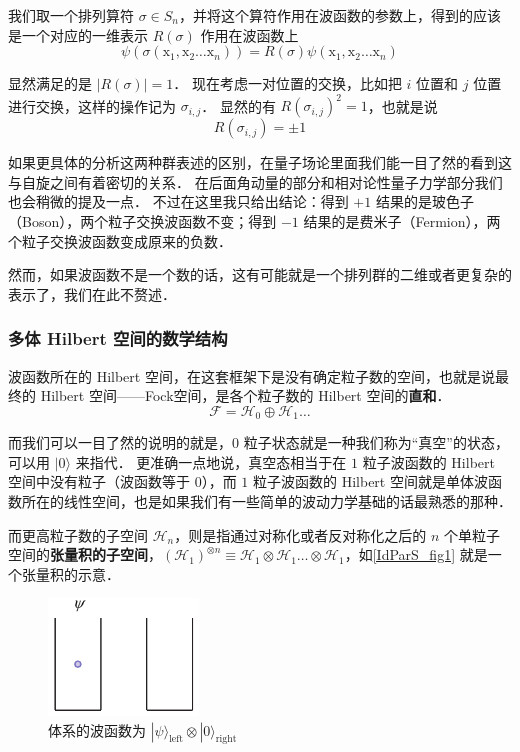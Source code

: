 我们取一个排列算符 $\sigma\in S_n$，并将这个算符作用在波函数的参数上，得到的应该是一个对应的一维表示 $R(\sigma)$ 作用在波函数上
\begin{equation}
\psi(\sigma ({\mathrm x}_1, {\mathrm x}_2\dots{\mathrm x}_n)) = R(\sigma)\psi({\mathrm x}_1, {\mathrm x}_2\dots{\mathrm x}_n)
\end{equation}

显然满足的是 $|R(\sigma)| = 1$． 现在考虑一对位置的交换，比如把 $i$ 位置和 $j$ 位置进行交换，这样的操作记为 $\sigma_{i,j}$． 显然的有 $R(\sigma_{i,j})^2 = 1$，也就是说
\begin{equation}
R(\sigma_{i,j}) = \pm 1
\end{equation}

如果更具体的分析这两种群表述的区别，在量子场论里面我们能一目了然的看到这与自旋之间有着密切的关系． 在后面角动量的部分和相对论性量子力学部分我们也会稍微的提及一点． 不过在这里我只给出结论：得到 $+1$ 结果的是玻色子（Boson），两个粒子交换波函数不变；得到 $-1$ 结果的是费米子（Fermion），两个粒子交换波函数变成原来的负数．

然而，如果波函数不是一个数的话，这有可能就是一个排列群的二维或者更复杂的表示了，我们在此不赘述．

\subsubsection{多体 Hilbert 空间的数学结构}

波函数所在的 Hilbert 空间，在这套框架下是没有确定粒子数的空间，也就是说最终的 Hilbert 空间——Fock空间，是各个粒子数的 Hilbert 空间的\textbf{直和}．
\begin{equation}
\mathcal{F} = \mathcal{H}_0 \oplus \mathcal{H}_1\dots
\end{equation}

而我们可以一目了然的说明的就是，$0$ 粒子状态就是一种我们称为“真空”的状态，可以用 $|0\rangle$ 来指代． 更准确一点地说，真空态相当于在 $1$ 粒子波函数的 Hilbert 空间中没有粒子（波函数等于 $0$），而 $1$ 粒子波函数的 Hilbert 空间就是单体波函数所在的线性空间，也是如果我们有一些简单的波动力学基础的话最熟悉的那种．

而更高粒子数的子空间 $\mathcal{H}_n$，则是指通过对称化或者反对称化之后的 $n$ 个单粒子空间的\textbf{张量积的子空间}，$(\mathcal{H}_1)^{\otimes n} \equiv \mathcal{H}_1\otimes \mathcal{H}_1\dots\otimes\mathcal{H}_1$，如\autoref{IdParS_fig1} 就是一个张量积的示意．

\begin{figure}[ht]
\centering
\includegraphics[width=4cm]{./figures/IdParS_1.pdf}
\caption{体系的波函数为 $|\psi\rangle_\text{left}\otimes|0\rangle_\text{right}$} \label{IdParS_fig1}
\end{figure}


